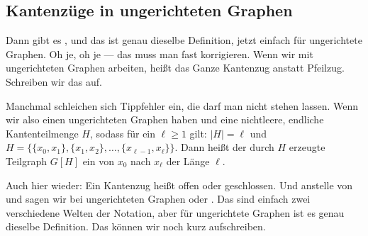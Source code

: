 \subsection{Kantenzüge in ungerichteten Graphen}

\begin{spoken-clean}[01:07:24 - 01:10:00]
Dann gibt es , und das ist genau dieselbe Definition, jetzt einfach für ungerichtete Graphen. Oh je, oh je --- das muss man fast korrigieren. Wenn wir mit ungerichteten Graphen arbeiten, heißt das Ganze Kantenzug anstatt Pfeilzug. Schreiben wir das auf.

Manchmal schleichen sich Tippfehler ein, die darf man nicht stehen lassen. Wenn wir also einen ungerichteten Graphen haben und eine nichtleere, endliche Kantenteilmenge $H$, sodass für ein $\ell \ge 1$ gilt: $|H| = \ell$ und $H = \{ \{x_0, x_1\}, \{x_1, x_2\}, \dots, \{x_{\ell-1}, x_\ell\} \}$. Dann heißt der durch $H$ erzeugte Teilgraph $G[H]$ ein  von $x_0$ nach $x_\ell$ der Länge $\ell$.
\end{spoken-clean}

\begin{spoken-clean}[01:10:00 - 01:14:24]
Auch hier wieder: Ein Kantenzug heißt offen oder geschlossen. Und anstelle von  und  sagen wir bei ungerichteten Graphen  oder . Das sind einfach zwei verschiedene Welten der Notation, aber für ungerichtete Graphen ist es genau dieselbe Definition. Das können wir noch kurz aufschreiben.
\end{spoken-clean}

